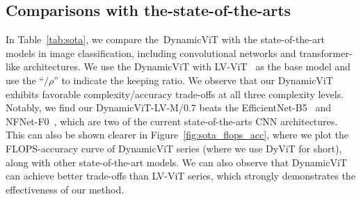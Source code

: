 \documentclass{article}
\newcommand{\dynamvit}{DynamicViT}
\begin{document}
\subsection{Comparisons with the-state-of-the-arts}
In Table~\ref{tab:sota}, we compare the~\dynamvit{} with the state-of-the-art models in image classification, including convolutional networks and transformer-like architectures. We use the \dynamvit{} with LV-ViT~\cite{jiang2021token} as the base model and use the ``$/\rho$'' to indicate the keeping ratio. We observe that our \dynamvit{} exhibits favorable complexity/accuracy trade-offs at all three complexity levels. Notably, we find our DynamicViT-LV-M/0.7 beats the EfficientNet-B5~\cite{tan2019efficientnet} and NFNet-F0~\cite{brock2021nfnet}, which are two of the current state-of-the-arts CNN architectures. This can also be shown clearer in Figure~\ref{fig:sota_flops_acc}, where we plot the FLOPS-accuracy curve of \dynamvit{} series  (where we use DyViT for short), along with  other state-of-the-art models. We can also observe that \dynamvit{} can achieve better trade-offs than LV-ViT series, which strongly demonstrates the effectiveness of our method.
\end{document}
